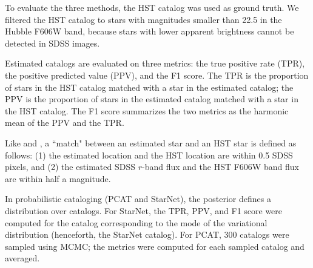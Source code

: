 To evaluate the three methods, the HST catalog was used as ground truth. 
We filtered the HST catalog to stars with magnitudes smaller than 22.5 in the Hubble F606W band, because stars with lower apparent brightness cannot be detected in SDSS images. 


Estimated catalogs are evaluated on three metrics: the true positive rate (TPR), the positive predicted value (PPV), and the F1 score. The TPR is the proportion of stars in the HST catalog matched with a star in the estimated catalog;
the PPV is the proportion of stars in the estimated catalog matched with a star in the HST catalog. The F1 score summarizes the two metrics as the harmonic mean of the PPV and the TPR.

Like \cite{Portillo_2017} and \cite{Feder_2019}, a ``match" between an estimated star and an HST star is defined as follows: (1) the estimated location and the HST location are within 0.5 SDSS pixels, and (2) the estimated SDSS $r$-band flux and the HST F606W band flux are within half a magnitude. 

In probabilistic cataloging (PCAT and StarNet), the posterior defines a distribution over catalogs. 
For StarNet, the TPR, PPV, and F1 score were computed for the catalog corresponding to the mode of the variational distribution (henceforth, the StarNet catalog). 
For PCAT, 300 catalogs were sampled using MCMC; the metrics were computed for each sampled catalog and averaged. 

